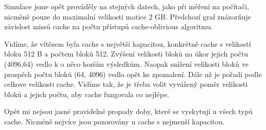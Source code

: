 \documentclass[12pt,a4paper]{report}
\begin{document}
Simulace jsme opět prováděly na stejných datech, jako při měření 
na počítači, nicměně pouze do maximalní velikosti matice 2 GB.
Předchozí graf znázorňuje závislost missů cache na počtu přístupů cache-oblivious algoritmu.

Vidíme, že vítězem byla cache s největší kapacitou, konkrétně cache s velikostí bloku 512 B
a počtem bloků 512. Zvýšení velikosti bloků na úkor jejich počtu (4096,64) vedlo k o něco horším výsledkům.
Naopak snížení velikosti bloků ve prospěch počtu bloků (64, 4096) vedlo opět ke zpomalení. 
Dále už je pořadí podle celkove velikosti cache. Vidíme tak, že je třeba volit vyvážený poměr
velikosti bloků a jejich počtu, aby cache fungovala co nejlépe.

Opět mi nejsou jasné pravidelné propady doby, které se vyskytují u všech typů cache. Nicméně
nejvíce jsou pozorovány u cache s nejmenší kapacitou.


  
\end{document}
